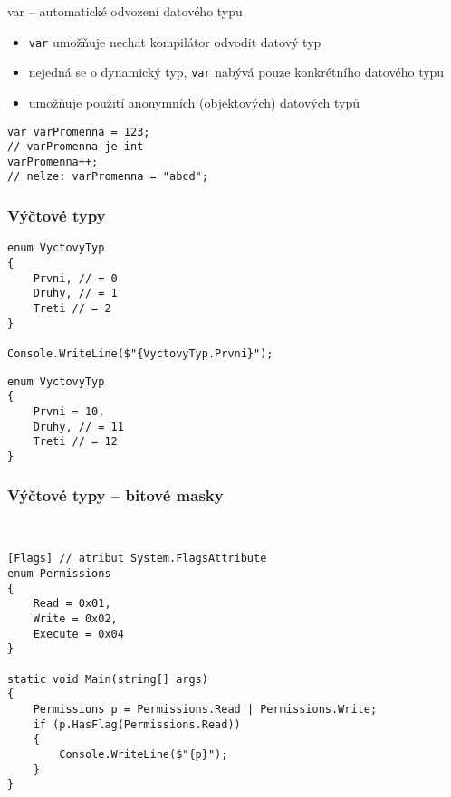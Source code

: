 \begin{frame}[fragile]
\vfill
\begin{block}{var -- automatické odvození datového typu}
\begin{itemize}
\item \lstinline|var| umožňuje nechat kompilátor odvodit datový typ
\item nejedná se o dynamický typ, \lstinline|var| nabývá pouze konkrétního datového typu
\item umožňuje použití anonymních (objektových) datových typů 
\end{itemize}
\end{block}
\vfill
\begin{yesblock}
\begin{lstlisting}
var varPromenna = 123;
// varPromenna je int
varPromenna++;
// nelze: varPromenna = "abcd";
\end{lstlisting}
\end{yesblock}
\vfill
\end{frame}


\begin{frame}[fragile]
\frametitle{Výčtové typy}
\vfill
\begin{yesblock}
\begin{lstlisting}
enum VyctovyTyp
{
    Prvni, // = 0
    Druhy, // = 1
    Treti // = 2
}

Console.WriteLine($"{VyctovyTyp.Prvni}");
\end{lstlisting}
\end{yesblock}
\vfill
\begin{yesblock}
\begin{lstlisting}
enum VyctovyTyp
{
    Prvni = 10,
    Druhy, // = 11
    Treti // = 12
}
\end{lstlisting}
\end{yesblock}
\vfill
\end{frame}


\begin{frame}[fragile]
\frametitle{Výčtové typy -- bitové masky}
\begin{bonusblock}{~}
\begin{lstlisting}
[Flags] // atribut System.FlagsAttribute
enum Permissions
{
    Read = 0x01,
    Write = 0x02,
    Execute = 0x04
}

static void Main(string[] args)
{
    Permissions p = Permissions.Read | Permissions.Write;
    if (p.HasFlag(Permissions.Read))
    {
        Console.WriteLine($"{p}");
    }
}
\end{lstlisting}
\end{bonusblock}
\end{frame}


